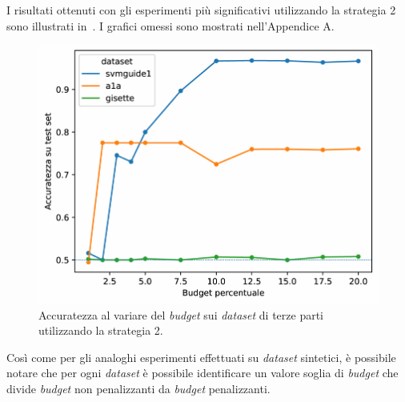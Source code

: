 I risultati ottenuti con gli esperimenti più significativi utilizzando la strategia 2 sono illustrati in~. I grafici omessi sono mostrati nell'Appendice A.
\begin{figure}
    \centering
    \includegraphics[width=0.5\linewidth]{img//TP/tp_new_strategy.pdf}
    \caption[Risultati su \emph{dataset} di terze parti utilizzando la strategia 2.]{Accuratezza al variare del \emph{budget} sui \emph{dataset} di terze parti utilizzando la strategia 2.}
    \label{fig:TP_new_strategy}
\end{figure}
Così come per gli analoghi esperimenti effettuati su \emph{dataset} sintetici, è possibile notare che per ogni \emph{dataset} è possibile identificare un valore soglia di \emph{budget} che divide \emph{budget} non penalizzanti da \emph{budget} penalizzanti.

